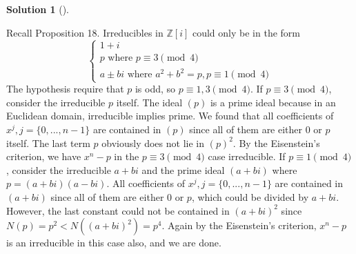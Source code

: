\documentclass{article}
\theoremstyle{definition}
\newtheorem*{sol}{Solution}
\newenvironment{sols}[1][]{%
  \begin{sol}[#1]$ $\par\nobreak\ignorespaces
}{%
  \end{sol}
}
\begin{document}
\begin{sols}
	Recall Proposition 18. 
	Irreducibles in $\mathbb{Z}[i]$ could only be in the form
	\[
		\begin{cases}
			1 + i\\
			p \text{ where } p \equiv 3 \pmod{4}\\
			a \pm bi \text{ where } a^2 + b^2 = p, p \equiv 1 \pmod{4}
		\end{cases}
	\]
	The hypothesis require that $p$ is odd, so $p \equiv 1, 3 \pmod{4}$. 
	If $p \equiv 3 \pmod{4}$, consider the irreducible $p$ itself. 
	The ideal $(p)$ is a prime ideal because in an Euclidean domain, irreducible implies prime. 
	We found that all coefficients of $x^j, j = \{0, ..., n - 1\}$ are contained in $(p)$ since all of them are either 0 or $p$ itself.
	The last term $p$ obviously does not lie in $(p)^2$. 
	By the Eisenstein's criterion, we have $x^n - p$ in the $p \equiv 3 \pmod{4}$ case irreducible. 
	If $p \equiv 1 \pmod{4}$, consider the irreducible $a + bi$ and the prime ideal $(a + bi)$ where $p = (a + bi)(a - bi)$. 
	All coefficients of $x^j, j = \{0, ..., n - 1\}$ are contained in $(a + bi)$ since all of them are either 0 or $p$, which could be divided by $a + bi$. 
	However, the last constant could not be contained in $(a + bi)^2$ since $N(p) = p^2 < N((a + bi)^2) =  p^4$. 
	Again by the Eisenstein's criterion, $x^n - p$ is an irreducible in this case also, and we are done.
\end{sols}
\end{document}
